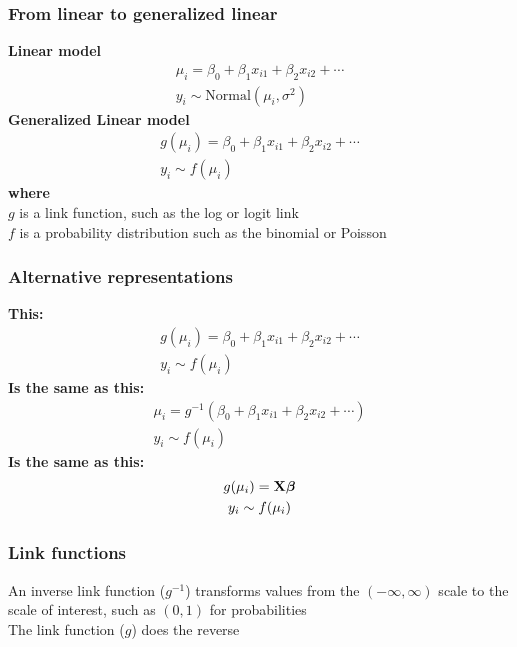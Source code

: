 \documentclass[color=usenames,dvipsnames]{beamer}\usepackage[]{graphicx}\usepackage[]{color}
\begin{document}
\begin{frame}
  \frametitle{From linear to generalized linear}
  {\bf Linear model}
  \begin{gather*}
    \mu_i = \beta_0 + \beta_1 x_{i1} + \beta_2 x_{i2} + \cdots \\
    y_i \sim \mathrm{Normal}(\mu_i, \sigma^2)
  \end{gather*}
  \pause
  \vfill
  {\bf Generalized Linear model}
  \begin{gather*}
    g(\mu_i) = \beta_0 + \beta_1 x_{i1} + \beta_2 x_{i2} + \cdots \\
    y_i \sim f(\mu_i)
  \end{gather*}
  \pause
  {\bf where} \\
  $g$ is a link function, such as the log or logit link \\
  \pause
  $f$ is a probability distribution such as the binomial or Poisson
\end{frame}


\begin{frame}
  \frametitle{Alternative representations}
  {\bf This:}
  \begin{gather*}
    g(\mu_i) = \beta_0 + \beta_1 x_{i1} + \beta_2 x_{i2} + \cdots \\
    y_i \sim f(\mu_i)
  \end{gather*}
  \pause
  {\bf Is the same as this:}
  \begin{gather*}
    \mu_i = g^{-1}(\beta_0 + \beta_1 x_{i1} + \beta_2 x_{i2} + \cdots) \\
    y_i \sim f(\mu_i)
  \end{gather*}
  \pause
  {\bf Is the same as this:}
  \begin{gather*}
    g(\mu_i) = {\bf X}{\bm \beta} \\
    y_i \sim f(\mu_i)
  \end{gather*}
\end{frame}


\begin{frame}
  \frametitle{Link functions}
  An inverse link function ($g^{-1}$) transforms values from the $(-\infty,\infty)$
  scale to the scale of interest, such as $(0,1)$ for probabilities  \\
  \pause
  \vfill
  The link function ($g$) does the reverse \\
\end{frame}
\end{document}
